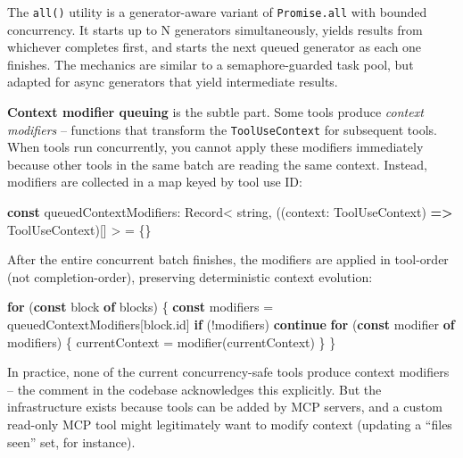 \documentclass[
  english,
  11pt,
  letterpaper,
]{book}
\newenvironment{Shaded}{\begin{snugshade}}{\end{snugshade}}
\newcommand{\AttributeTok}[1]{\textcolor[rgb]{0.40,0.45,0.13}{#1}}
\newcommand{\BuiltInTok}[1]{\textcolor[rgb]{0.00,0.23,0.31}{#1}}
\newcommand{\ControlFlowTok}[1]{\textcolor[rgb]{0.00,0.23,0.31}{\textbf{#1}}}
\newcommand{\FunctionTok}[1]{\textcolor[rgb]{0.28,0.35,0.67}{#1}}
\newcommand{\KeywordTok}[1]{\textcolor[rgb]{0.00,0.23,0.31}{\textbf{#1}}}
\newcommand{\NormalTok}[1]{\textcolor[rgb]{0.00,0.23,0.31}{#1}}
\newcommand{\OperatorTok}[1]{\textcolor[rgb]{0.37,0.37,0.37}{#1}}
\begin{document}
The \texttt{all()} utility is a generator-aware variant of
\texttt{Promise.all} with bounded concurrency. It starts up to N
generators simultaneously, yields results from whichever completes
first, and starts the next queued generator as each one finishes. The
mechanics are similar to a semaphore-guarded task pool, but adapted for
async generators that yield intermediate results.

\textbf{Context modifier queuing} is the subtle part. Some tools produce
\emph{context modifiers} -- functions that transform the
\texttt{ToolUseContext} for subsequent tools. When tools run
concurrently, you cannot apply these modifiers immediately because other
tools in the same batch are reading the same context. Instead, modifiers
are collected in a map keyed by tool use ID:

\begin{Shaded}
\begin{Highlighting}[]
\KeywordTok{const}\NormalTok{ queuedContextModifiers}\OperatorTok{:} \BuiltInTok{Record}\OperatorTok{\textless{}}
\NormalTok{  string}\OperatorTok{,}
\NormalTok{  ((context}\OperatorTok{:}\NormalTok{ ToolUseContext) }\KeywordTok{=\textgreater{}}\NormalTok{ ToolUseContext)[]}
\OperatorTok{\textgreater{}} \OperatorTok{=}\NormalTok{ \{\}}
\end{Highlighting}
\end{Shaded}

After the entire concurrent batch finishes, the modifiers are applied in
tool-order (not completion-order), preserving deterministic context
evolution:

\begin{Shaded}
\begin{Highlighting}[]
\ControlFlowTok{for}\NormalTok{ (}\KeywordTok{const}\NormalTok{ block }\KeywordTok{of}\NormalTok{ blocks) \{}
  \KeywordTok{const}\NormalTok{ modifiers }\OperatorTok{=}\NormalTok{ queuedContextModifiers[block}\OperatorTok{.}\AttributeTok{id}\NormalTok{]}
  \ControlFlowTok{if}\NormalTok{ (}\OperatorTok{!}\NormalTok{modifiers) }\ControlFlowTok{continue}
  \ControlFlowTok{for}\NormalTok{ (}\KeywordTok{const}\NormalTok{ modifier }\KeywordTok{of}\NormalTok{ modifiers) \{}
\NormalTok{    currentContext }\OperatorTok{=} \FunctionTok{modifier}\NormalTok{(currentContext)}
\NormalTok{  \}}
\NormalTok{\}}
\end{Highlighting}
\end{Shaded}

In practice, none of the current concurrency-safe tools produce context
modifiers -- the comment in the codebase acknowledges this explicitly.
But the infrastructure exists because tools can be added by MCP servers,
and a custom read-only MCP tool might legitimately want to modify
context (updating a ``files seen'' set, for instance).
\end{document}
